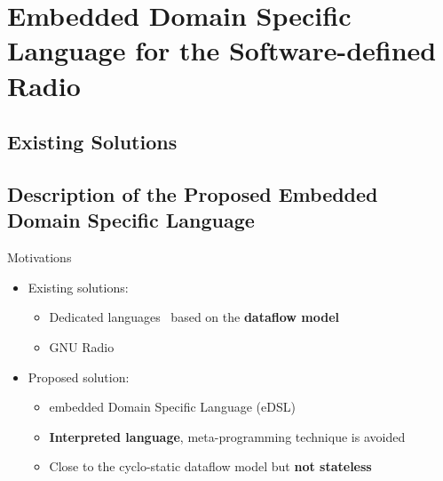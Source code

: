 
\section[eDSL for the SDR]{Embedded Domain Specific Language for the Software-defined Radio}

\subsection[Existing Solutions]{Existing Solutions}

\subsection[Proposed eDSL]{Description of the Proposed Embedded Domain Specific Language}

\begin{frame}{Motivations}
  \begin{itemize}
    \item Existing solutions:
    \begin{itemize}
      \item Dedicated languages~\cite{Amarasinghe2005,DeOliveiraCastro2017} based on the \textbf{dataflow model}
      \item GNU Radio~\cite{GNURadio}
    \end{itemize}
    \vspace{0.1cm}
    \item<2-> Proposed solution:
    \begin{itemize}
      \item \Cxx embedded Domain Specific Language (eDSL)
      \item \textbf{Interpreted language}, meta-programming technique is avoided
      \item Close to the cyclo-static dataflow model but \textbf{not stateless}
    \end{itemize}
  \end{itemize}
  \vfill


\end{frame}

